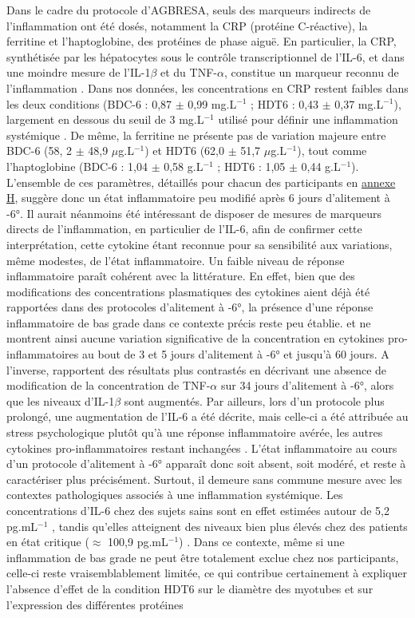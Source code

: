 \documentclass[11pt]{report}
\begin{document}
Dans le cadre du protocole d'AGBRESA, seuls des marqueurs indirects de l'inflammation ont été dosés, notamment la CRP (protéine C-réactive), la ferritine et l'haptoglobine, des protéines de phase aiguë. En particulier, la CRP, synthétisée par les hépatocytes sous le contrôle transcriptionnel de l'IL-6, et dans une moindre mesure de l'IL-1$\beta$ et du TNF-$\alpha$, constitue un marqueur reconnu de l'inflammation \parencite{Rizo-Tellez2023Jul}. Dans nos données, les concentrations en CRP restent faibles dans les deux conditions (BDC-6 : 0,87 $\pm$ 0,99 mg.L$^{-1}$ ; HDT6 : 0,43 $\pm$ 0,37 mg.L$^{-1}$), largement en dessous du seuil de 3 mg.L$^{-1}$ utilisé pour définir une inflammation systémique \parencite{Wieczorek2021Sep}. De même, la ferritine ne présente pas de variation majeure entre BDC-6 (58, 2 $\pm$ 48,9 $\mu$g.L$^{-1}$) et HDT6 (62,0 $\pm$ 51,7 $\mu$g.L$^{-1}$), tout comme l'haptoglobine (BDC-6 : 1,04 $\pm$ 0,58 g.L$^{-1}$ ; HDT6 : 1,05 $\pm$ 0,44 g.L$^{-1}$). L'ensemble de ces paramètres, détaillés pour chacun des participants en \hyperref[annexeH]{annexe H}, suggère donc un état inflammatoire peu modifié après 6 jours d'alitement à -6°. Il aurait néanmoins été intéressant de disposer de mesures de marqueurs directs de l'inflammation, en particulier de l'IL-6, afin de confirmer cette interprétation, cette cytokine étant reconnue pour sa sensibilité aux variations, même modestes, de l'état inflammatoire. Un faible niveau de réponse inflammatoire paraît cohérent avec la littérature. En effet, bien que des modifications des concentrations plasmatiques des cytokines aient déjà été rapportées dans des protocoles d'alitement à -6°, la présence d'une réponse inflammatoire de bas grade dans ce contexte précis reste peu établie. \textcite{Feuerecker2013Jul} et \textcite{Bonnefoy2022Feb} ne montrent ainsi aucune variation significative de la concentration en cytokines pro-inflammatoires au bout de 3 et 5 jours d'alitement à -6° et jusqu'à 60 jours. A l'inverse, \textcite{Schmitt2000} rapportent des résultats plus contrastés en décrivant une absence de modification de la concentration de TNF-$\alpha$ sur 34 jours d'alitement à -6°, alors que les niveaux d'IL-1$\beta$ sont augmentés. Par ailleurs, lors d'un protocole plus prolongé, une augmentation de l'IL-6 a été décrite, mais celle-ci a été attribuée au stress psychologique plutôt qu'à une réponse inflammatoire avérée, les autres cytokines pro-inflammatoires restant inchangées \parencite{Chouker2001May}. L'état inflammatoire au cours d'un protocole d'alitement à -6° apparaît donc soit absent, soit modéré, et reste à caractériser plus précisément. Surtout, il demeure sans commune mesure avec les contextes pathologiques associés à une inflammation systémique. Les concentrations d'IL-6 chez des sujets sains sont en effet estimées autour de 5,2 pg.mL$^{-1}$ \parencite{Said2021Jun}, tandis qu'elles atteignent des niveaux bien plus élevés chez des patients en état critique ($\approx$ 100,9 pg.mL$^{-1}$) \parencite{Picod2022May}. Dans ce contexte, même si une inflammation de bas grade ne peut être totalement exclue chez nos participants, celle-ci reste vraisemblablement limitée, ce qui contribue certainement à expliquer l'absence d'effet de la condition HDT6 sur le diamètre des myotubes et sur l'expression des différentes protéines 
\end{document}
